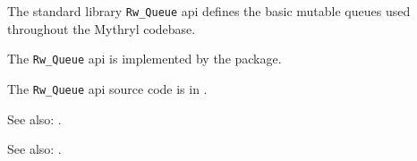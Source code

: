 
The standard library {\tt Rw\_Queue} api defines the basic mutable queues used 
throughout the Mythryl codebase.

The {\tt Rw\_Queue} api is implemented by the  package.

The {\tt Rw\_Queue} api source code is in .

See also: .

See also: .




